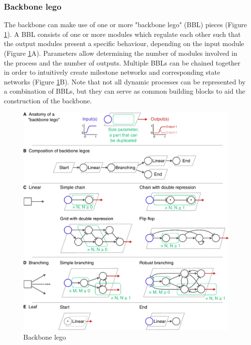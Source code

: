 \subsubsection{Backbone lego} \label{sec:dyngen_backbone_lego}
The backbone can make use of one or more "backbone lego" (BBL) pieces (Figure \ref{fig:backbone_lego}). A BBL consists of one or more modules which regulate each other such that the output modules present a specific behaviour, depending on the input module (Figure \ref{fig:backbone_lego}A). Parameters allow determining the number of modules involved in the process and the number of outputs. Multiple BBLs can be chained together in order to intuitively create milestone networks and corresponding state networks (Figure \ref{fig:backbone_lego}B). Note that not all dynamic processes can be represented by a combination of BBLs, but they can serve as common building blocks to aid the construction of the backbone.

\begin{figure}[htb!]
	\centering
	\includegraphics[width=\LARGEfigure]{fig/backbone_lego} 
	\caption{Backbone lego}
	\label{fig:backbone_lego}
\end{figure}


